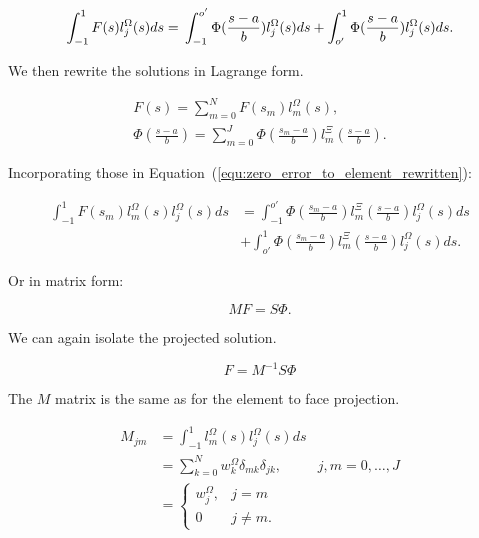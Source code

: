 \begin{equation} \label{equ:zero_error_to_element_rewritten}
    \int_{-1}^{1}F(s)l_j^\Omega(s)ds = \\
    \int_{-1}^{o'} \Phi (\frac{s -a}{b}) l_j^\Omega(s)ds +
    \int_{o'}^{1} \Phi(\frac{s-a}{b})l_j^\Omega(s)ds.
\end{equation}

\noindent
We then rewrite the solutions in Lagrange form.

\begin{gather}
    F(s) = \sum_{m = 0}^{N}F(s_m)l_m^\Omega(s), \\
    \Phi(\frac{s -a}{b}) = \sum_{m = 0}^{J}\Phi(\frac{s_m -a}{b})l_m^\Xi(\frac{s -a}{b}).
\end{gather}

\noindent
Incorporating those in Equation~(\ref{equ:zero_error_to_element_rewritten}):

\begin{equation}
    \begin{aligned}
        \int_{-1}^{1}F(s_m)l_m^\Omega(s) l_j^\Omega(s)ds & = \int_{-1}^{o'} \Phi(\frac{s_m -a}{b})l_m^\Xi(\frac{s -a}{b}) l_j^\Omega(s)ds \\
                                                         & + \int_{o'}^{1} \Phi(\frac{s_m -a}{b})l_m^\Xi(\frac{s -a}{b}) l_j^\Omega(s)ds.
    \end{aligned}
\end{equation}

\noindent
Or in matrix form:

\begin{equation}
    MF = S \Phi.
\end{equation}

\noindent
We can again isolate the projected solution.

\begin{equation}
    F = M^{-1} S \Phi
\end{equation}

\noindent
The \(M\) matrix is the same as for the element to face projection.

\begin{equation} \label{equ:matrix_M_face_to_element}
    \begin{aligned}
        M_{jm} & = \int_{-1}^{1}l_m^{\Omega}(s)l_j^{\Omega}(s)ds                                \\
               & = \sum_{k = 0}^{N} w_k ^{\Omega} \delta_{mk}\delta_{jk}, & j, m = 0, \ldots, J \\
               & = \left \{ \begin{matrix}
                                w_j^{\Omega }, & j = m     \\
                                0              & j \neq m.
                            \end{matrix}\right.
    \end{aligned}
\end{equation}

